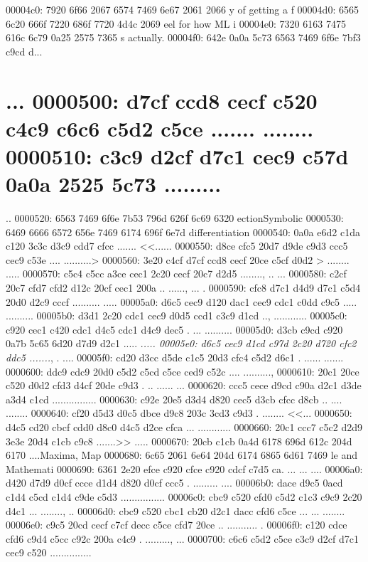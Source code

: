 00004c0: 7920 6f66 2067 6574 7469 6e67 2061 2066  y of getting a f
00004d0: 6565 6c20 666f 7220 686f 7720 4d4c 2069  eel for how ML i
00004e0: 7320 6163 7475 616c 6c79 0a25 2575 7365  s actually.%
00004f0: 642e 0a0a 5c73 6563 7469 6f6e 7bf3 c9cd  d...\section{...
0000500: d7cf ccd8 cecf c520 c4c9 c6c6 c5d2 c5ce  ....... ........
0000510: c3c9 d2cf d7c1 cec9 c57d 0a0a 2525 5c73  .........}..%
0000520: 6563 7469 6f6e 7b53 796d 626f 6c69 6320  ection{Symbolic 
0000530: 6469 6666 6572 656e 7469 6174 696f 6e7d  differentiation}
0000540: 0a0a e6d2 c1da c120 3c3c d3c9 cdd7 cfcc  ....... <<......
0000550: d8ce cfc5 20d7 d9de c9d3 ccc5 cec9 c53e  .... ..........>
0000560: 3e20 c4cf d7cf ccd8 cecf 20ce c5cf d0d2  > ........ .....
0000570: c5c4 c5cc a3ce cec1 2c20 cecf 20c7 d2d5  ........, .. ...
0000580: c2cf 20c7 cfd7 cfd2 d12c 20cf cec1 200a  .. ......, ... .
0000590: cfc8 d7c1 d4d9 d7c1 c5d4 20d0 d2c9 cccf  .......... .....
00005a0: d6c5 cec9 d120 dac1 cec9 cdc1 c0dd c9c5  ..... ..........
00005b0: d3d1 2c20 cdc1 cec9 d0d5 ccd1 c3c9 d1cd  .., ............
00005c0: c920 cec1 c420 cdc1 d4c5 cdc1 d4c9 dec5  . ... ..........
00005d0: d3cb c9cd c920 0a7b 5c65 6d20 d7d9 d2c1  ..... .{\em ....
00005e0: d6c5 cec9 d1cd c97d 2c20 d720 cfc2 ddc5  .......}, . ....
00005f0: cd20 d3cc d5de c1c5 20d3 cfc4 c5d2 d6c1  . ...... .......
0000600: ddc9 cdc9 20d0 c5d2 c5cd c5ce ced9 c52c  .... ..........,
0000610: 20c1 20ce c520 d0d2 cfd3 d4cf 20de c9d3   . .. ...... ...
0000620: ccc5 cece d9cd c90a d2c1 d3de a3d4 c1cd  ................
0000630: c92e 20e5 d3d4 d820 cec5 d3cb cfcc d8cb  .. .... ........
0000640: cf20 d5d3 d0c5 dbce d9c8 203c 3cd3 c9d3  . ........ <<...
0000650: d4c5 cd20 cbcf cdd0 d8c0 d4c5 d2ce cfca  ... ............
0000660: 20c1 ccc7 c5c2 d2d9 3e3e 20d4 c1cb c9c8   .......>> .....
0000670: 20cb c1cb 0a4d 6178 696d 612c 204d 6170   ....Maxima, Map
0000680: 6c65 2061 6e64 204d 6174 6865 6d61 7469  le and Mathemati
0000690: 6361 2e20 efce c920 cfce c920 cdcf c7d5  ca. ... ... ....
00006a0: d420 d7d9 d0cf ccce d1d4 d820 d0cf ccc5  . ......... ....
00006b0: dace d9c5 0acd c1d4 c5cd c1d4 c9de c5d3  ................
00006c0: cbc9 c520 cfd0 c5d2 c1c3 c9c9 2c20 d4c1  ... ........, ..
00006d0: cbc9 c520 cbc1 cb20 d2c1 dacc cfd6 c5ce  ... ... ........
00006e0: c9c5 20cd cecf c7cf decc c5ce cfd7 20ce  .. ........... .
00006f0: c120 cdce cfd6 c9d4 c5cc c92c 200a c4c9  . ........., ...
0000700: c6c6 c5d2 c5ce c3c9 d2cf d7c1 cec9 c520  ............... 
